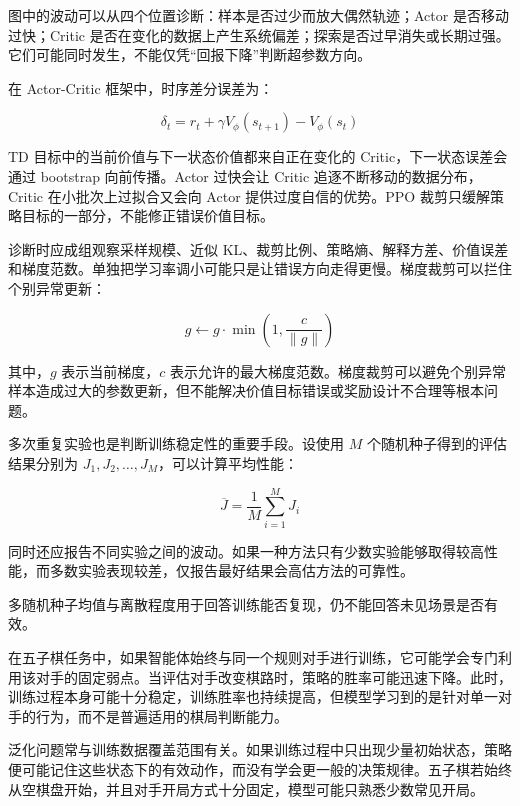 \documentclass[UTF8,a4paper,zihao=-4,oneside,openany]{ctexbook}
\begin{document}
图中的波动可以从四个位置诊断：样本是否过少而放大偶然轨迹；Actor 是否移动过快；Critic 是否在变化的数据上产生系统偏差；探索是否过早消失或长期过强。它们可能同时发生，不能仅凭“回报下降”判断超参数方向。

在 Actor-Critic 框架中，时序差分误差为：

\begin{equation}
\delta_t
=
r_t
+
\gamma V_{\phi}(s_{t+1})
-
V_{\phi}(s_t)
\end{equation}

TD 目标中的当前价值与下一状态价值都来自正在变化的 Critic，下一状态误差会通过 bootstrap 向前传播。Actor 过快会让 Critic 追逐不断移动的数据分布，Critic 在小批次上过拟合又会向 Actor 提供过度自信的优势。PPO 裁剪只缓解策略目标的一部分，不能修正错误价值目标。

诊断时应成组观察采样规模、近似 KL、裁剪比例、策略熵、解释方差、价值误差和梯度范数。单独把学习率调小可能只是让错误方向走得更慢。梯度裁剪可以拦住个别异常更新：

\begin{equation}
g
\leftarrow
g
\cdot
\min
\left(
1,
\frac{c}{\|g\|}
\right)
\end{equation}

其中，$g$ 表示当前梯度，$c$ 表示允许的最大梯度范数。梯度裁剪可以避免个别异常样本造成过大的参数更新，但不能解决价值目标错误或奖励设计不合理等根本问题。

多次重复实验也是判断训练稳定性的重要手段。设使用 $M$ 个随机种子得到的评估结果分别为 $J_1,J_2,\ldots,J_M$，可以计算平均性能：

\begin{equation}
\overline{J}
=
\frac{1}{M}
\sum_{i=1}^{M}
J_i
\end{equation}

同时还应报告不同实验之间的波动。如果一种方法只有少数实验能够取得较高性能，而多数实验表现较差，仅报告最好结果会高估方法的可靠性。

多随机种子均值与离散程度用于回答训练能否复现，仍不能回答未见场景是否有效。

在五子棋任务中，如果智能体始终与同一个规则对手进行训练，它可能学会专门利用该对手的固定弱点。当评估对手改变棋路时，策略的胜率可能迅速下降。此时，训练过程本身可能十分稳定，训练胜率也持续提高，但模型学习到的是针对单一对手的行为，而不是普遍适用的棋局判断能力。


泛化问题常与训练数据覆盖范围有关。如果训练过程中只出现少量初始状态，策略便可能记住这些状态下的有效动作，而没有学会更一般的决策规律。五子棋若始终从空棋盘开始，并且对手开局方式十分固定，模型可能只熟悉少数常见开局。
\end{document}
